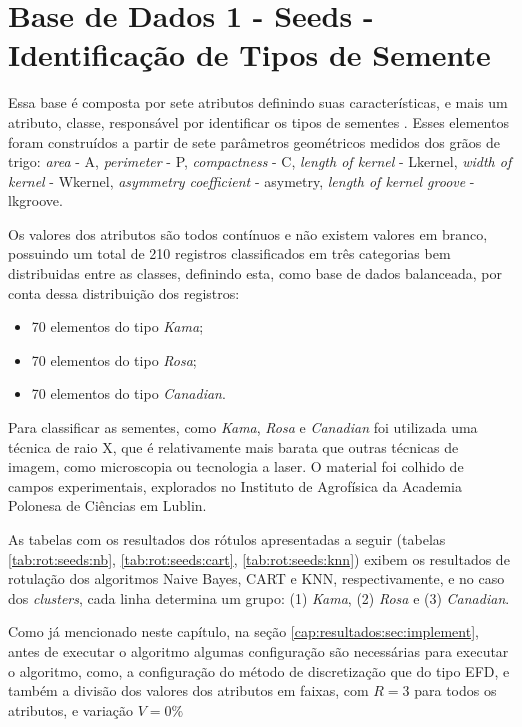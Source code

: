 \section{Base de Dados 1 - Seeds - Identificação de Tipos de Semente}
Essa base é composta por sete  atributos definindo suas características, e mais um atributo, classe,  responsável por identificar os tipos de sementes \cite{Charytanowicz2010}. Esses elementos foram construídos a partir de sete parâmetros geométricos medidos dos grãos de trigo: \textit{area} - A, \textit{perimeter} - P, \textit{compactness} - C, \textit{length of kernel} - Lkernel, \textit{width of kernel} - Wkernel, \textit{asymmetry coefficient} - asymetry, \textit{length of kernel groove} - lkgroove.

Os valores dos atributos  são todos contínuos e não existem valores em branco,  possuindo um total de 210 registros classificados em três categorias bem distribuidas entre as classes, definindo esta, como base de dados balanceada, por conta dessa distribuição dos registros:
\begin{itemize}[noitemsep]
 \item 70 elementos do tipo \textit{Kama};
 \item 70 elementos do tipo \textit{Rosa};
 \item 70 elementos do tipo \textit{Canadian}.
\end{itemize}
Para classificar as sementes, como \textit{Kama}, \textit{Rosa} e \textit{Canadian} foi utilizada uma técnica de raio X, que é relativamente mais barata que outras técnicas de imagem, como microscopia ou tecnologia a laser. O material foi colhido de campos experimentais, explorados no Instituto de Agrofísica da Academia Polonesa de Ciências em Lublin.


As tabelas com os resultados dos rótulos apresentadas a seguir (tabelas \ref{tab:rot:seeds:nb}, \ref{tab:rot:seeds:cart}, \ref{tab:rot:seeds:knn}) exibem os resultados de rotulação dos algoritmos Naive Bayes, CART e KNN, respectivamente, e no caso dos \textit{clusters}, cada linha determina um grupo: (1) \textit{Kama}, (2) \textit{Rosa} e (3) \textit{Canadian}. 


Como já mencionado neste capítulo, na seção \ref{cap:resultados:sec:implement}, antes de executar o algoritmo algumas configuração são necessárias para executar o algoritmo, como, a configuração do método de discretização que do tipo EFD, e também a divisão dos valores dos atributos em faixas, com ${R=3}$ para todos os atributos, e variação ${V=0\%}$ 

